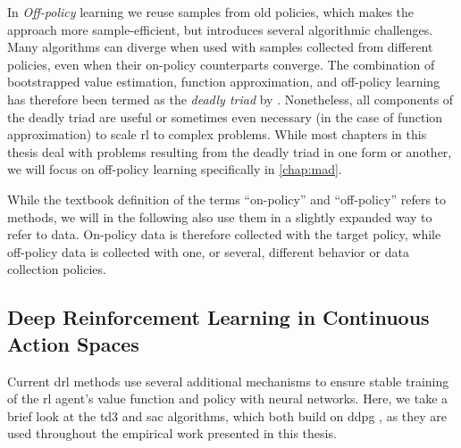 In \emph{Off-policy} learning we reuse samples from old policies, which makes the approach more sample-efficient, but introduces several algorithmic challenges.
Many algorithms can diverge when used with samples collected from different policies, even when their on-policy counterparts converge.
The combination of bootstrapped value estimation, function approximation, and off-policy learning has therefore been termed as the \emph{deadly triad} by \textcite{suttonbook}.
Nonetheless, all components of the deadly triad are useful or sometimes even necessary (in the case of function approximation) to scale \ac{rl} to complex problems.
While most chapters in this thesis deal with problems resulting from the deadly triad in one form or another, we will focus on off-policy learning specifically in \autoref{chap:mad}.

While the textbook definition of the terms ``on-policy'' and ``off-policy'' refers to methods, we will in the following also use them in a slightly expanded way to refer to data.
On-policy data is therefore collected with the target policy, while off-policy data is collected with one, or several, different behavior or data collection policies.

\subsection{Deep Reinforcement Learning in Continuous Action Spaces}
\label{sec:background:drl}


Current \ac{drl} methods use several additional mechanisms to ensure stable training of the \ac{rl} agent's value function and policy with neural networks.
Here, we take a brief look at the \ac{td3} \parencite{td3} and \ac{sac} \parencite{sac} algorithms, which both build on \ac{ddpg} \parencite{ddpg}, as they are used throughout the empirical work presented in this thesis.

